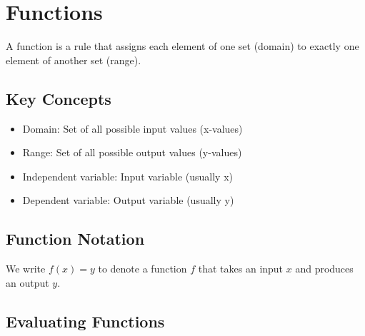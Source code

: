 \documentclass[12pt]{article}
\begin{document}
\begin{center}
\end{center}

\section{Functions}

A function is a rule that assigns each element of one set (domain) to exactly one element of another set (range).

\subsection{Key Concepts}

\begin{itemize}
    \item Domain: Set of all possible input values (x-values)
    \item Range: Set of all possible output values (y-values)
    \item Independent variable: Input variable (usually x)
    \item Dependent variable: Output variable (usually y)
\end{itemize}

\subsection{Function Notation}

We write $f(x) = y$ to denote a function $f$ that takes an input $x$ and produces an output $y$.

\subsection{Evaluating Functions}
\end{document}
